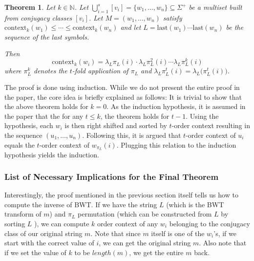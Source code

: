 \documentclass[11pt,letterpaper,titlepage]{article}
\newtheorem{theorem}{Theorem}
\begin{document}
\begin{theorem}
\newcommand*{\context}[2]{\ensuremath{\mathrm{context}_{#1}(#2)}}
\newcommand*{\last}[1]{\ensuremath{\mathrm{last}(#1)}}
Let $k \in \mathbb{N}$. Let
$\bigcup_{i=1}^s[v_i]=\{w_1,\ldots,w_n\}\subseteq\Sigma^+$ be a multiset built
from conjugacy classes $[v_i]$. Let $M=(w_1,\ldots,w_n)$ satisfy
$\context{k}{w_1}\leq\cdots\leq\context{k}{w_n}$ and let
$L=\last{w_1}\cdots\last{w_n}$ be the sequence of the last symbols.

Then
\[\context{k}{w_i}=\lambda_L\pi_L(i)\cdot\lambda_L\pi_L^2(i)\cdots\lambda_L\pi_L^k(i)\]
where $\pi_L^k$ denotes the $t$-fold application of $\pi_L$ and $\lambda_L\pi_L^t(i)=\lambda_L\big(\pi_L^t(i)\big)$.
\end{theorem}

The proof is done using induction. While we do not present the entire proof in
the paper, the core idea is briefly explained as follows: It is trivial to show
that the above theorem holds for $k=0$. As the induction hypothesis, it is
assumed in the paper that the for any $t \leq k$, the theorem holds for $t-1$.
Using the hypothesis, each $w_i$ is then right shifted and sorted by $t$-order
context resulting in the sequence $(u_1,\ldots,u_n)$. Following this, it is
argued that $t$-order context of $u_i$ equals the $t$-order context of
$w_{\pi_L}(i)$. Plugging this relation to the induction hypothesis yields the
induction.

\subsubsection{List of Necessary Implications for the Final Theorem}

Interestingly, the proof mentioned in the previous section itself tells us how
to compute the inverse of BWT. If we have the string $L$ (which is the BWT
transform of $m$) and $\pi_L$ permutation (which can be constructed from $L$ by
sorting $L$ ), we can compute $k$ order context of any $w_i$ belonging to the
conjugacy class of our original string $m$. Note that since $m$ itself is one
of the $w_i$'s, if we start with the correct value of $i$, we can get the
original string $m$. Also note that if we set the value of $k$ to be
$length(m)$, we get the entire $m$ back.


{}
\end{document}
